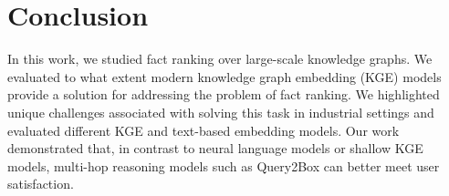 \section{Conclusion}\label{sec:ali_conclusion}
In this work, we studied fact ranking over large-scale knowledge graphs. We evaluated to what extent modern knowledge graph embedding (KGE) models provide a solution for addressing the problem of fact ranking. We highlighted unique challenges associated with solving this task in industrial settings and evaluated different KGE and text-based embedding models. Our work demonstrated that, in contrast to neural language models or shallow KGE models, multi-hop reasoning models such as Query2Box can better meet user satisfaction.

